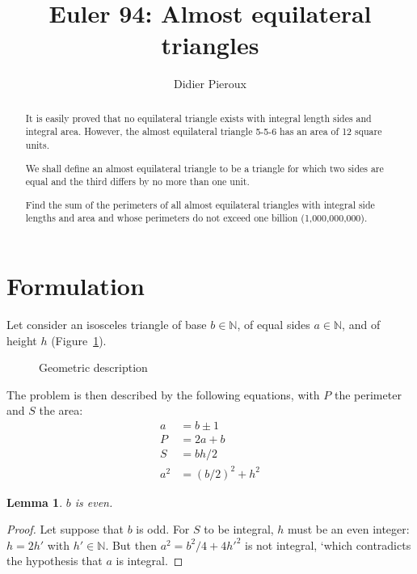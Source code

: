 \documentclass[11pt, a4paper]{article}
\newtheorem{lemma}[theorem]{Lemma}
\newcommand{\Figure}[1]{Figure~\ref{#1}}
\newcommand{\set}[1]{\mathbb{#1}}
\begin{document}
\title{Euler 94: Almost equilateral triangles}
\date{}
\author{Didier Pieroux}
\maketitle

\begin{abstract}
It is easily proved that no equilateral triangle exists with integral length sides and integral area. However, the almost equilateral triangle 5-5-6 has an area of 12 square units.

We shall define an almost equilateral triangle to be a triangle for which two sides are equal and the third differs by no more than one unit.

Find the sum of the perimeters of all almost equilateral triangles with integral side lengths and area and whose perimeters do not exceed one billion (1,000,000,000).
\end{abstract}

\section{Formulation}
Let consider an isosceles triangle of base $b\in\set N$, of equal sides $a\in\set N$, and of height $h$ (\Figure{fig:triangle1}).
  
\begin{figure}[h]
    \begin{center}
        \caption{Geometric description}
        \label{fig:triangle1}
    \end{center}
\end{figure}

The problem is then described by the following equations, with $P$ the perimeter and $S$ the area:
\begin{align}
    a & = b \pm 1 \\ \label{eq:a1}
    P & = 2a+b \\ 
    S & = bh/2 \\
    a^2 & = (b/2)^2 + h^2 \label{eq:pytha1}
\end{align} 
    
\begin{lemma}$b$ is even.\end{lemma}
\begin{proof} Let suppose that $b$ is odd. For $S$ to be integral, $h$ must be an even integer: $h=2h'$ with $h'\in\set N$. But then $a^2 = b^2/4 + 4h'^2$ is not integral, `which contradicts the hypothesis that $a$ is integral.
\end{proof}
\end{document}
